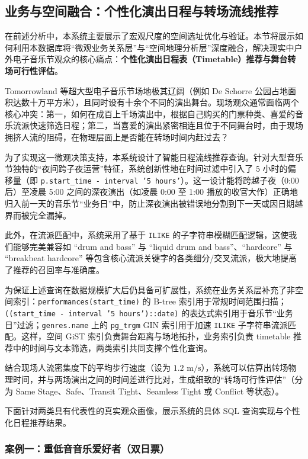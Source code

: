 \documentclass[11pt,a4paper,fontset=fandol]{ctexart}
\begin{document}
\subsection{业务与空间融合：个性化演出日程与转场流线推荐}

在前述分析中，本系统主要展示了宏观尺度的空间选址优化与验证。本节将展示如何利用本数据库将“微观业务关系层”与“空间地理分析层”深度融合，解决现实中户外电子音乐节观众的核心痛点：\textbf{个性化演出日程表（Timetable）推荐与舞台转场可行性评估}。

Tomorrowland 等超大型电子音乐节场地极其辽阔（例如 De Schorre 公园占地面积达数十万平方米），且同时设有十余个不同的演出舞台。现场观众通常面临两个核心冲突：第一，如何在成百上千场演出中，根据自己购买的门票种类、喜爱的音乐流派快速筛选日程；第二，当喜爱的演出紧密相连且位于不同舞台时，由于现场拥挤人流的阻碍，在物理层面上是否能在转场时间内赶过去？

为了实现这一微观决策支持，本系统设计了智能日程流线推荐查询。针对大型音乐节独特的“夜间跨子夜运营”特征，系统创新性地在时间过滤中引入了 5 小时的偏移量（即 \texttt{p.start\_time - interval '5 hours'}）。这一设计能将跨越子夜（0:00 后）至凌晨 5:00 之间的深夜演出（如凌晨 0:00 至 1:00 播放的收官大作）正确地归入前一天的音乐节“业务日”中，防止深夜演出被错误地分割到下一天或因日期越界而被完全漏掉。

此外，在流派匹配中，系统采用了基于 \texttt{ILIKE} 的子字符串模糊匹配逻辑，这使我们能够完美兼容如 “drum and bass” 与 “liquid drum and bass”、“hardcore” 与 “breakbeat hardcore” 等包含核心流派关键字的各类细分/交叉流派，极大地提高了推荐的召回率与准确度。

为保证上述查询在数据规模扩大后仍具备可扩展性，系统在业务关系层补充了非空间索引：\texttt{performances(start\_time)} 的 B-tree 索引用于常规时间范围扫描；\texttt{((start\_time - interval '5 hours')::date)} 的表达式索引用于音乐节“业务日”过滤；\texttt{genres.name} 上的 \texttt{pg\_trgm} GIN 索引用于加速 \texttt{ILIKE} 子字符串流派匹配。这样，空间 GiST 索引负责舞台距离与场地拓扑，业务索引负责 timetable 推荐中的时间与文本筛选，两类索引共同支撑个性化查询。

结合现场人流密集度下的平均步行速度（设为 $1.2 \text{ m/s}$），系统可以估算出转场物理时间，并与两场演出之间的时间差进行比对，生成细致的“转场可行性评估”（分为 Same Stage、Safe、Transit Tight、Seamless Tight 或 Conflict 等状态）。

下面针对两类具有代表性的真实观众画像，展示系统的具体 SQL 查询实现与个性化日程推荐结果。

\subsubsection*{案例一：重低音音乐爱好者（双日票）}
\end{document}
